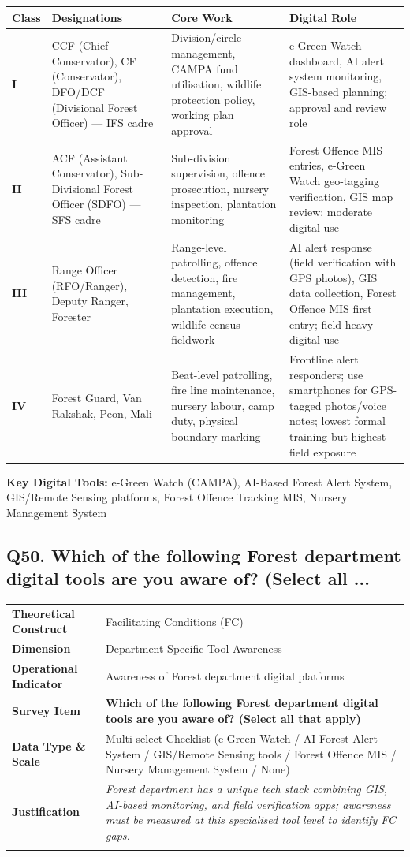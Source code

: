 \documentclass[11pt,a4paper]{article}
\makeatletter
\newcommand{\qcard}[8]{%
\noindent\begin{tabularx}{\textwidth}{@{}>{\columncolor{#7}\bfseries\small}L{3.2cm}|X@{}}
\arrayrulecolor{#8}\hline
Theoretical Construct & #1 \\
Dimension & #2 \\
Operational Indicator & #3 \\
\arrayrulecolor{gold}\hline
\rowcolor{white}\textbf{\color{#8}Survey Item} & \textbf{\color{#8}#4} \\
\arrayrulecolor{gold}\hline
Data Type \& Scale & #5 \\
Justification & \textit{#6} \\
\arrayrulecolor{#8}\hline
\end{tabularx}\vspace{10pt}
}
\makeatother
\begin{document}
\begin{table}[H]\centering\small
\begin{tabularx}{\textwidth}{L{1.2cm} L{3.5cm} L{4.5cm} X}
\toprule
\textbf{Class} & \textbf{Designations} & \textbf{Core Work} & \textbf{Digital Role} \\
\midrule
\textbf{I} & CCF (Chief Conservator), CF (Conservator), DFO/DCF (Divisional Forest Officer) --- IFS cadre & Division/circle management, CAMPA fund utilisation, wildlife protection policy, working plan approval & e-Green Watch dashboard, AI alert system monitoring, GIS-based planning; approval and review role \\[4pt]
\textbf{II} & ACF (Assistant Conservator), Sub-Divisional Forest Officer (SDFO) --- SFS cadre & Sub-division supervision, offence prosecution, nursery inspection, plantation monitoring & Forest Offence MIS entries, e-Green Watch geo-tagging verification, GIS map review; moderate digital use \\[4pt]
\textbf{III} & Range Officer (RFO/Ranger), Deputy Ranger, Forester & Range-level patrolling, offence detection, fire management, plantation execution, wildlife census fieldwork & AI alert response (field verification with GPS photos), GIS data collection, Forest Offence MIS first entry; field-heavy digital use \\[4pt]
\textbf{IV} & Forest Guard, Van Rakshak, Peon, Mali & Beat-level patrolling, fire line maintenance, nursery labour, camp duty, physical boundary marking & Frontline alert responders; use smartphones for GPS-tagged photos/voice notes; lowest formal training but highest field exposure \\
\bottomrule
\end{tabularx}
\end{table}

\textbf{Key Digital Tools:} e-Green Watch (CAMPA), AI-Based Forest Alert System, GIS/Remote Sensing platforms, Forest Offence Tracking MIS, Nursery Management System

\subsection*{Q50. Which of the following Forest department digital tools are you aware of? (Select all ...}
\qcard{Facilitating Conditions (FC)}{Department-Specific Tool Awareness}{Awareness of Forest department digital platforms}{Which of the following Forest department digital tools are you aware of? (Select all that apply)}{Multi-select Checklist (e-Green Watch / AI Forest Alert System / GIS/Remote Sensing tools / Forest Offence MIS / Nursery Management System / None)}{Forest department has a unique tech stack combining GIS, AI-based monitoring, and field verification apps; awareness must be measured at this specialised tool level to identify FC gaps.}{forbg}{forcol}
\end{document}
